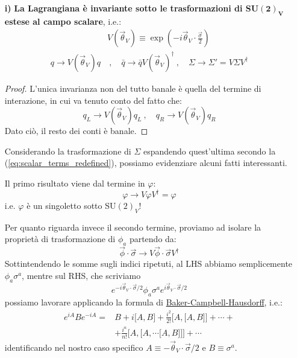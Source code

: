 \documentclass[../main.tex]{subfiles}
\begin{document}
\begin{enumerate}
    \item[\textbf{i)}] \textbf{La Lagrangiana è invariante sotto le trasformazioni di SU$\mathbf{(2)_V}$ estese al campo scalare}, i.e.:
    \begin{equation}
        \boxed{\begin{aligned}
            &V(\Vec{\theta}_V) \equiv \exp(-i\Vec{\theta}_V\cdot\frac{\Vec{\sigma}}{2})\\
             q\rightarrow V(\Vec{\theta}_V) q&~,\quad \bar q\rightarrow \bar q V(\Vec{\theta}_V)^\dagger~,\quad \Sigma\rightarrow \Sigma'= V\Sigma V^\dagger
        \end{aligned}}
        \label{eq:SU2_V_enlargedlagrangian_symmetry}
    \end{equation}
    \begin{proof}
        L'unica invarianza non del tutto banale è quella del termine di interazione, in cui va tenuto conto del fatto che:
        \[
        q_L\rightarrow V(\Vec{\theta}_V) q_L ~,\quad q_R\rightarrow V(\Vec{\theta}_V) q_R
        \]
        Dato ciò, il resto dei conti è banale.
    \end{proof}
    \begin{nota}
        Considerando la trasformazione di $\Sigma$ espandendo quest'ultima secondo la (\ref{eq:scalar_terms_redefined}), possiamo evidenziare alcuni fatti interessanti.

        Il primo risultato viene dal termine in $\varphi$:
        \begin{equation}
            \boxed{\varphi \rightarrow V\varphi V^\dagger = \varphi}
            \label{eq:varphi_is_SU2_V_singlet}
        \end{equation}
        i.e. $\varphi$ è un singoletto sotto SU$(2)_V$!

        Per quanto riguarda invece il secondo termine, proviamo ad isolare la proprietà di trasformazione di $\phi_a$ partendo da:
        \[
        \Vec{\phi}\cdot\Vec{\sigma} \rightarrow V\Vec{\phi}\cdot\Vec{\sigma} V^\dagger
        \]
        Sottintendendo le somme sugli indici ripetuti, al LHS abbiamo semplicemente $\phi_a\sigma^a$, mentre sul RHS, che scriviamo
        \[
        e^{-i\Vec{\theta}_V\cdot\Vec{\sigma}/{2}}\phi_a\sigma^a e^{i\Vec{\theta}_V\cdot\Vec{\sigma}/{2}}
        \]
        possiamo lavorare applicando la formula di \href{https://it.wikipedia.org/wiki/Formula_di_Baker-Campbell-Hausdorff}{Baker-Campbell-Hausdorff}, i.e.:
        \begin{equation}
            \begin{aligned}
                e^{iA}Be^{-iA} =& B +i\big[A,B\big] + \frac{i^2}{2!}\big[A,\big[A,B\big]\big] + \cdots +\\
                &+\frac{i^n}{n!}\big[A,\big[A, \cdots \big[A,B\big]\big]\big]+ \cdots
            \end{aligned}
            \label{eq:BCH_formula}
        \end{equation}
        identificando nel nostro caso specifico $A\equiv -\Vec{\theta}_V\cdot\Vec{\sigma}/{2}$ e $B\equiv \sigma^a$.


\end{nota}
\end{enumerate}
\end{document}
